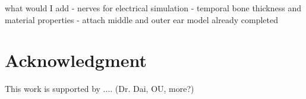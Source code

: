 \documentclass[12pt]{article}
\begin{document}
what would I add
- nerves for electrical simulation
- temporal bone thickness and material properties
- attach middle and outer ear model already completed
   
\section{Acknowledgment}
This work is supported by .... (Dr. Dai, OU, more?)



\end{document}
